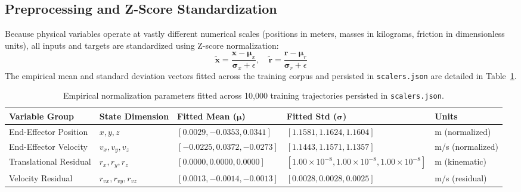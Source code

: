 \documentclass[10pt,a4paper]{article}
\begin{document}
\subsection{Preprocessing and Z-Score Standardization}
Because physical variables operate at vastly different numerical scales (positions in meters, masses in kilograms, friction in dimensionless units), all inputs and targets are standardized using Z-score normalization:
\begin{equation}
\tilde{\mathbf{x}} = \frac{\mathbf{x} - \bm{\mu}_x}{\bm{\sigma}_x + \epsilon}, \quad \tilde{\mathbf{r}} = \frac{\mathbf{r} - \bm{\mu}_r}{\bm{\sigma}_r + \epsilon}
\label{eq:z_score}
\end{equation}
The empirical mean and standard deviation vectors fitted across the training corpus and persisted in \texttt{scalers.json} are detailed in Table~\ref{tab:scalers}.

\begin{table}[h]
\centering
\small
\begin{tabularx}{\linewidth}{p{3.2cm}p{2.2cm}p{4.0cm}p{4.0cm}X}
\toprule
\textbf{Variable Group} & \textbf{State Dimension} & \textbf{Fitted Mean ($\bm{\mu}$)} & \textbf{Fitted Std ($\bm{\sigma}$)} & \textbf{Units} \\
\midrule
End-Effector Position & $x, y, z$ & $[0.0029, -0.0353, 0.0341]$ & $[1.1581, 1.1624, 1.1604]$ & m (normalized) \\
End-Effector Velocity & $v_x, v_y, v_z$ & $[-0.0225, 0.0372, -0.0273]$ & $[1.1443, 1.1571, 1.1357]$ & m/s (normalized) \\
Translational Residual & $r_x, r_y, r_z$ & $[0.0000, 0.0000, 0.0000]$ & $[1.00\times 10^{-8}, 1.00\times 10^{-8}, 1.00\times 10^{-8}]$ & m (kinematic) \\
Velocity Residual & $r_{vx}, r_{vy}, r_{vz}$ & $[0.0013, -0.0014, -0.0013]$ & $[0.0028, 0.0028, 0.0025]$ & m/s (residual) \\
\bottomrule
\end{tabularx}
\caption{Empirical normalization parameters fitted across 10,000 training trajectories persisted in \texttt{scalers.json}.}
\label{tab:scalers}
\end{table}
\end{document}
